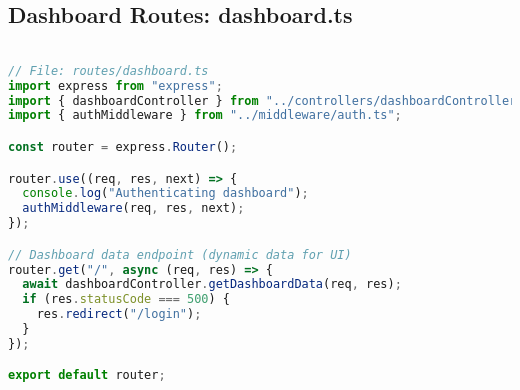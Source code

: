 \subsection{Dashboard Routes: dashboard.ts}
\begin{lstlisting}[language=TypeScript]

// File: routes/dashboard.ts
import express from "express";
import { dashboardController } from "../controllers/dashboardController.ts";
import { authMiddleware } from "../middleware/auth.ts";

const router = express.Router();

router.use((req, res, next) => {
  console.log("Authenticating dashboard");
  authMiddleware(req, res, next);
});

// Dashboard data endpoint (dynamic data for UI)
router.get("/", async (req, res) => {
  await dashboardController.getDashboardData(req, res);
  if (res.statusCode === 500) {
    res.redirect("/login");
  }
});

export default router;
\end{lstlisting}

